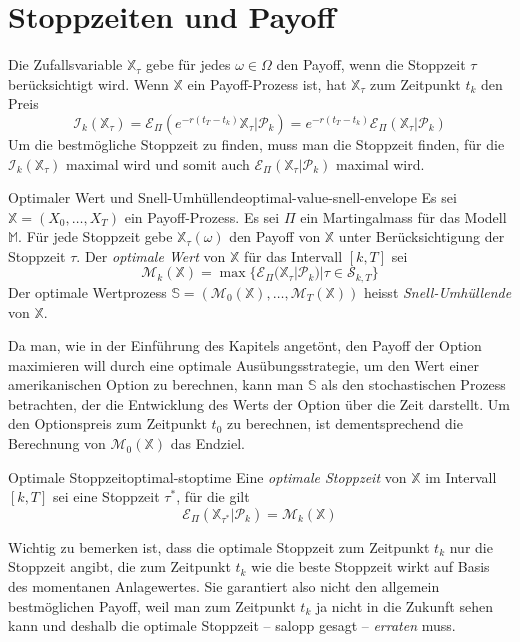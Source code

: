 \documentclass[11pt]{report} %
\begin{document}
\section{Stoppzeiten und Payoff}
Die Zufallsvariable $\mathbb{X}_\tau$ gebe für jedes $\omega \in \Omega$ den Payoff, wenn die Stoppzeit $\tau$ berücksichtigt wird. Wenn $\mathbb{X}$ ein Payoff-Prozess ist, hat $\mathbb{X}_\tau$ zum Zeitpunkt $t_k$ den Preis 
\begin{equation}\label{eq:price-func-american}
    \mathcal{I}_k(\mathbb{X}_\tau)=\mathcal{E}_\Pi(e^{-r(t_T-t_k)}\mathbb{X}_\tau|\mathcal{P}_k)=e^{-r(t_T-t_k)}\mathcal{E}_\Pi(\mathbb{X}_\tau|\mathcal{P}_k)
\end{equation}
Um die bestmögliche Stoppzeit zu finden, muss man die Stoppzeit finden, für die $\mathcal{I}_k(\mathbb{X}_\tau)$ maximal wird und somit auch $\mathcal{E}_\Pi(\mathbb{X}_\tau|\mathcal{P}_k)$ maximal wird. 
\begin{Definition}{Optimaler Wert und Snell-Umhüllende}{optimal-value-snell-envelope}
    Es sei $\mathbb{X}=(X_0, \ldots, X_T)$ ein Payoff-Prozess. Es sei $\Pi$ ein Martingalmass für das Modell $\mathbb{M}$. Für jede Stoppzeit gebe $\mathbb{X}_\tau(\omega)$ den Payoff von $\mathbb{X}$ unter Berücksichtigung der Stoppzeit $\tau$. Der \textit{optimale Wert} von $\mathbb{X}$ für das Intervall $[k, T]$ sei $$\mathcal{M}_k(\mathbb{X})=\max\{\mathcal{E}_\Pi(\mathbb{X}_\tau|\mathcal{P}_k)|\tau \in \mathcal{S}_{k, T}\}$$Der optimale Wertprozess $\mathbb{S}=(\mathcal{M}_0(\mathbb{X}), \ldots, \mathcal{M}_T(\mathbb{X}))$ heisst \textit{Snell-Umhüllende} von $\mathbb{X}$. 
\end{Definition}
Da man, wie in der Einführung des Kapitels angetönt, den Payoff der Option maximieren will durch eine optimale Ausübungsstrategie, um den Wert einer amerikanischen Option zu berechnen, kann man $\mathbb{S}$ als den stochastischen Prozess betrachten, der die Entwicklung des Werts der Option über die Zeit darstellt. Um den Optionspreis zum Zeitpunkt $t_0$ zu berechnen, ist dementsprechend die Berechnung von $\mathcal{M}_0(\mathbb{X})$ das Endziel.
\begin{Definition}{Optimale Stoppzeit}{optimal-stoptime}
    Eine \textit{optimale Stoppzeit} von $\mathbb{X}$ im Intervall $[k, T]$ sei eine Stoppzeit $\tau^*$, für die gilt $$\mathcal{E}_\Pi(\mathbb{X}_{\tau^*}|\mathcal{P}_k)=\mathcal{M}_k(\mathbb{X})$$
\end{Definition}
Wichtig zu bemerken ist, dass die optimale Stoppzeit zum Zeitpunkt $t_k$ nur die Stoppzeit angibt, die zum Zeitpunkt $t_k$ wie die beste Stoppzeit wirkt auf Basis des momentanen Anlagewertes. Sie garantiert also nicht den allgemein bestmöglichen Payoff, weil man zum Zeitpunkt $t_k$ ja nicht in die Zukunft sehen kann und deshalb die optimale Stoppzeit -- salopp gesagt -- \textit{erraten} muss.
\end{document}
